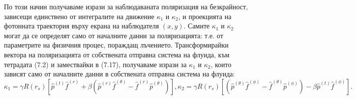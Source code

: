 По този начин получаваме изрази за наблюдаваната поляризация на безкрайност, зависещи единствено от интегралите на движение $\kappa_1$ и $\kappa_2$, и проекцията на фотонната траектория върху екрана на наблюдателя $(x,y)$. Самите $\kappa_1$ и $\kappa_2$ могат да се определят само от началните данни за поляризацията: т.е. от параметрите на физичния процес, пораждащ лъчението. Трансформирайки вектора на поляризацията от собствената отправна система на флуида, към тетрадата (7.2) и замествайки в (7.17), получаваме изрази за $\kappa_1$ и $\kappa_2$, които зависят само от началните данни в собствената отправна система на флуида:
\begin{subequations}
	\begin{equation}
		\kappa_1 = \gamma R(r_s)\left[\hat{p}^{(t)}\hat{f}^{(r)} + \beta\left(\hat{p}^{(r)}\hat{f}^{(\theta)} - \hat{f}^{(r)}\hat{p}^{(\theta)}\right)\right],
	\end{equation}
	\begin{equation}
		\kappa_2 = \gamma R(r_s)\left[\left(\hat{p}^{(\theta)}\hat{f}^{(\phi)} - \hat{f}^{(\theta)}\hat{p}^{(\phi)}\right) - \beta \hat{p}^{(t)} \hat{f}^{(\phi)}\right].
	\end{equation}
\end{subequations}

